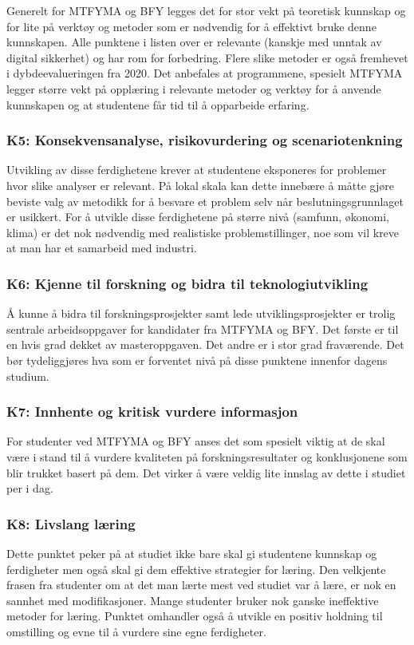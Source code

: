 Generelt for MTFYMA og BFY legges det for stor vekt på teoretisk kunnskap og for lite på verktøy og metoder som er nødvendig for å effektivt bruke denne kunnskapen. Alle punktene i listen over er relevante (kanskje med unntak av digital sikkerhet) og har rom for forbedring. Flere slike metoder er også fremhevet i dybdeevalueringen fra 2020. Det anbefales at programmene, spesielt MTFYMA legger større vekt på opplæring i relevante metoder og verktøy for å anvende kunnskapen og at studentene får tid til å opparbeide erfaring.

\subsubsection{K5: Konsekvensanalyse, risikovurdering og scenariotenkning}
Utvikling av disse ferdighetene krever at studentene eksponeres for problemer hvor slike analyser er relevant. På lokal skala kan dette innebære å måtte gjøre beviste valg av metodikk for å besvare et problem selv når beslutningsgrunnlaget er usikkert. For å utvikle disse ferdighetene på større nivå (samfunn, økonomi, klima) er det nok nødvendig med realistiske problemstillinger, noe som vil kreve at man har et samarbeid med industri.

\subsubsection{K6: Kjenne til forskning og bidra til teknologiutvikling}
Å kunne å bidra til forskningsprosjekter samt lede utviklingsprosjekter er trolig sentrale arbeidsoppgaver for kandidater fra MTFYMA og BFY. Det første er til en hvis grad dekket av masteroppgaven. Det andre er i stor grad fraværende. Det bør tydeliggjøres hva som er forventet nivå på disse punktene innenfor dagens studium.

\subsubsection{K7: Innhente og kritisk vurdere informasjon}
For studenter ved MTFYMA og BFY anses det som spesielt viktig at de skal være i stand til å vurdere kvaliteten på forskningsresultater og konklusjonene som blir trukket basert på dem. Det virker å være veldig lite innslag av dette i studiet per i dag.

\subsubsection{K8: Livslang læring}
Dette punktet peker på at studiet ikke bare skal gi studentene kunnskap og ferdigheter men også skal gi dem effektive strategier for læring. Den velkjente frasen fra studenter om at det man lærte mest ved studiet var å lære, er nok en sannhet med modifikasjoner. Mange studenter bruker nok ganske ineffektive metoder for læring. Punktet omhandler også å utvikle en positiv holdning til omstilling og evne til å vurdere sine egne ferdigheter.

